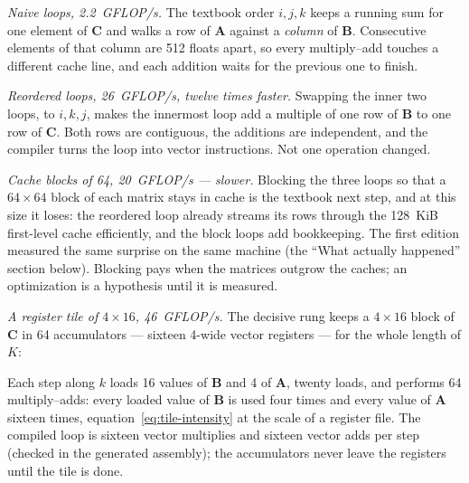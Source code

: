 
\emph{Naive loops, 2.2~GFLOP/s.} The textbook order $i, j, k$ keeps a running sum
for one element of $\mathbf{C}$ and walks a row of $\mathbf{A}$ against a
\emph{column} of $\mathbf{B}$. Consecutive elements of that column are 512 floats
apart, so every multiply--add touches a different cache line, and each addition
waits for the previous one to finish.

\emph{Reordered loops, 26~GFLOP/s, twelve times faster.} Swapping the inner two
loops, to $i, k, j$, makes the innermost loop add a multiple of one row of
$\mathbf{B}$ to one row of $\mathbf{C}$. Both rows are contiguous, the additions
are independent, and the compiler turns the loop into vector instructions. Not
one operation changed.

\emph{Cache blocks of 64, 20~GFLOP/s --- slower.} Blocking the three loops so
that a $64 \times 64$ block of each matrix stays in cache is the textbook next
step, and at this size it loses: the reordered loop already streams its rows
through the 128~KiB first-level cache efficiently, and the block loops add
bookkeeping. The first edition measured the same surprise on the same machine
(the ``What actually happened'' section below). Blocking pays when the matrices
outgrow the caches; an optimization is a hypothesis until it is measured.

\emph{A register tile of $4 \times 16$, 46~GFLOP/s.} The decisive rung keeps a
$4 \times 16$ block of $\mathbf{C}$ in 64 accumulators --- sixteen 4-wide vector
registers --- for the whole length of $K$:


\noindent Each step along $k$ loads 16 values of $\mathbf{B}$ and 4 of
$\mathbf{A}$, twenty loads, and performs 64 multiply--adds: every loaded value
of $\mathbf{B}$ is used four times and every value of $\mathbf{A}$ sixteen times,
equation~\eqref{eq:tile-intensity} at the scale of a register file. The compiled
loop is sixteen vector multiplies and sixteen vector adds per step (checked in
the generated assembly); the accumulators never leave the registers until the
tile is done.


